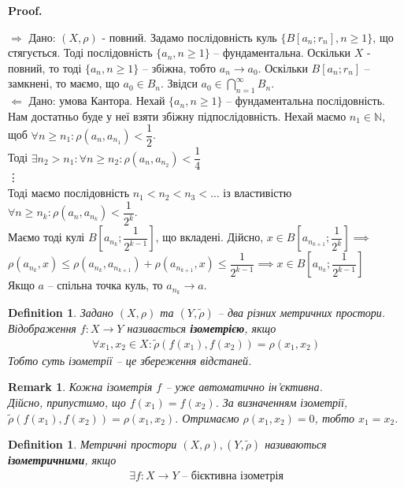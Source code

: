 \documentclass[a4paper, 10pt]{article}
\makeatletter
\def\rightproof{$\boxed{\Rightarrow}$ }
\def\leftproof{$\boxed{\Leftarrow}$ }
\theoremstyle{theoremdd}
\theoremstyle{theoremdd}
\newtheorem{definition}[theorem]{Definition}
\theoremstyle{theoremdd}
\theoremstyle{theoremdd}
\theoremstyle{theoremdd}
\theoremstyle{theoremdd}
\newtheorem{remark}[theorem]{Remark}
\theoremstyle{theoremdd}
\theoremstyle{theoremdd}
\renewenvironment{proof}[1][Proof.\\]{\par
\pushQED{\hfill \qed}%
\normalfont \topsep6\p@\@plus6\p@\relax
\trivlist
\item\relax
{\bfseries
#1\@addpunct{.}}\hspace\labelsep\ignorespaces
}{%
\popQED\endtrivlist\@endpefalse
}
\makeatother
\begin{document}
\begin{proof}
\rightproof Дано: $(X,\rho)$ - повний. Задамо послідовність куль $\{B[a_n;r_n], n \geq 1\}$, що стягується. Тоді послідовність $\{a_n, n \geq 1\}$ -- фундаментальна. Оскільки $X$ - повний, то тоді $\{a_n, n \geq 1\}$ -- збіжна, тобто $a_n \to a_0$. Оскільки $B[a_n;r_n]$ -- замкнені, то маємо, що $a_0 \in B_n$. Звідси $a_0 \displaystyle \in \bigcap_{n=1}^\infty B_n$.
\bigskip \\
\leftproof Дано: умова Кантора. Нехай $\{a_n, n \geq 1\}$ -- фундаментальна послідовність. Нам достатньо буде у неї взяти збіжну підпослідовність. Нехай маємо $n_1 \in \mathbb{N}$, щоб $\forall n \geq n_1: \rho(a_n,a_{n_1}) < \dfrac{1}{2}$.\\
Тоді $\exists n_2 > n_1: \forall n \geq n_2: \rho(a_n,a_{n_2}) < \dfrac{1}{4}$\\
\vdots \\
Тоді маємо послідовність $n_1 < n_2 < n_3 < \dots$ із властивістю $\forall n \geq n_k: \rho(a_n,a_{n_k}) < \dfrac{1}{2^k}$.\\
Маємо тоді кулі $B\left[a_{n_k}; \dfrac{1}{2^{k-1}} \right]$, що вкладені. Дійсно, $x \in B\left[a_{n_{k+1}}; \dfrac{1}{2^{k}} \right] \implies$\\
$\rho(a_{n_k}, x) \leq \rho(a_{n_k}, a_{n_{k+1}}) + \rho(a_{n_{k+1}},x) \leq \dfrac{1}{2^{k-1}} \implies x \in B\left[a_{n_k}; \dfrac{1}{2^{k-1}} \right]$\\
Якщо $a$ -- спільна точка куль, то $a_{n_k} \to a$.
\end{proof}

\begin{definition}
Задано $(X,\rho)$ та $(Y, \tilde{\rho})$ -- два різних метричних простори.\\
Відображення $f \colon X \to Y$ називається \textbf{ізометрією}, якщо
\begin{align*}
\forall x_1,x_2 \in X: \tilde{\rho}(f(x_1),f(x_2)) = \rho(x_1,x_2)
\end{align*}
Тобто суть ізометрії -- це збереження відстаней.
\end{definition}

\begin{remark}
Кожна ізометрія $f$ -- уже автоматично ін'єктивна.\\
Дійсно, припустимо, що $f(x_1) = f(x_2)$. За визначенням ізометрії, $\tilde{\rho}(f(x_1),f(x_2)) = \rho(x_1,x_2)$. Отримаємо $\rho(x_1,x_2) = 0$, тобто $x_1 = x_2$.
\end{remark}

\begin{definition}
Метричні простори $(X,\rho), (Y,\tilde{\rho})$ називаються \textbf{ізометричними}, якщо
\begin{align*}
\exists f \colon X \to Y \text{ -- бієктивна ізометрія}
\end{align*}
\end{definition}
\end{document}
